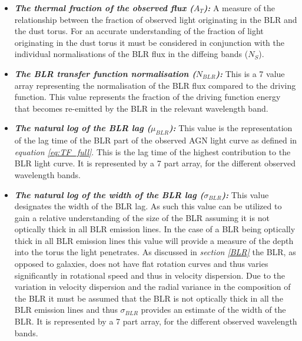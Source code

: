 \documentclass[a4paper, 12pt, twoside]{article}
\begin{document}
\begin{itemize}
\item {\bf{\emph{The thermal fraction of the observed flux ($A_{T}$):}}} A measure of the relationship between the fraction of observed light originating in the BLR and the dust torus. For an accurate understanding of the fraction of light originating in the dust torus it must be considered in conjunction with the individual normalisations of the BLR flux in the diffeing bands ($N_{S}$). 
\item {\bf{\emph{The BLR transfer function normalisation ($N_{BLR}$):}}} This is a 7 value array representing the normalisation of the BLR flux compared to the driving function. This value represents the fraction of the driving function energy that becomes re-emitted by the BLR in the relevant wavelength band. 
\item {\bf{\emph{The natural log of the BLR lag ($\mu_{BLR}$):}}} This value is the representation of the lag time of the BLR part of the observed AGN light curve as defined in \emph{equation \ref{eq:TF_full}}. This is the lag time of the highest contribution to the BLR light curve. It is represented by a 7 part array, for the different observed wavelength bands.
\item {\bf{\emph{The natural log of the width of the BLR lag ($\sigma_{BLR}$):}}} This value designates the width of the BLR lag. As such this value can be utilized to gain a relative understanding of the size of the BLR assuming it is not optically thick in all BLR emission lines. In the case of a BLR being optically thick in all BLR emission lines this value will provide a measure of the depth into the torus the light penetrates. As discussed in \emph{section \ref{BLR}} the BLR, as opposed to galaxies, does not have flat rotation curves and thus varies significantly in rotational speed and thus in velocity dispersion. Due to the variation in velocity dispersion and the radial variance in the composition of the BLR it must be assumed that the BLR is not optically thick in all the BLR emission lines and thus $\sigma_{BLR}$ provides an estimate of the width of the BLR. It is represented by a 7 part array, for the different observed wavelength bands.
\end{itemize}
\end{document}
